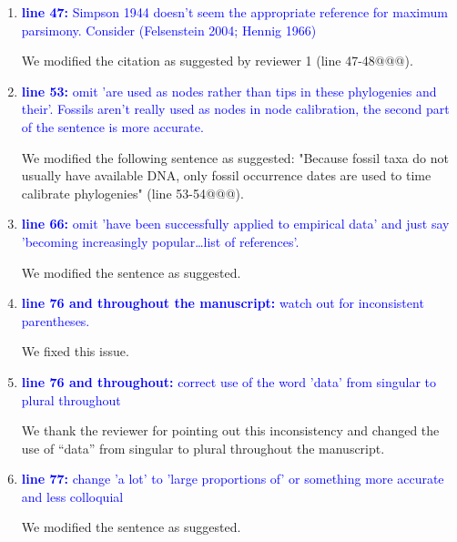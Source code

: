\documentclass[12pt,letterpaper]{article}
\begin{document}
\begin{enumerate}
\item{\textcolor{blue}{\textbf{line 47:} Simpson 1944 doesn't seem the appropriate reference for maximum parsimony. Consider (Felsenstein 2004; Hennig 1966) }}

We modified the citation as suggested by reviewer 1 (line 47-48@@@).

\item{\textcolor{blue}{\textbf{line 53:} omit 'are used as nodes rather than tips in these phylogenies and their'. Fossils aren't really used as nodes in node calibration, the second part of the sentence is more accurate.}}

We modified the following sentence as suggested: "Because fossil taxa do not usually have available DNA, only fossil occurrence dates are used to time calibrate phylogenies" (line 53-54@@@).

\item{\textcolor{blue}{\textbf{line 66:} omit 'have been successfully applied to empirical data' and just say 'becoming increasingly popular…list of references'. }}

We modified the sentence as suggested.

\item{\textcolor{blue}{\textbf{line 76 and throughout the manuscript:} watch out for inconsistent parentheses.}}

We fixed this issue.

\item{\textcolor{blue}{\textbf{line 76 and throughout:} correct use of the word 'data' from singular to plural throughout}}

We thank the reviewer for pointing out this inconsistency and changed the use of ``data'' from singular to plural throughout the manuscript. 

\item{\textcolor{blue}{\textbf{line 77:} change 'a lot' to 'large proportions of' or something more accurate and less colloquial}}

We modified the sentence as suggested.


\end{enumerate}
\end{document}
